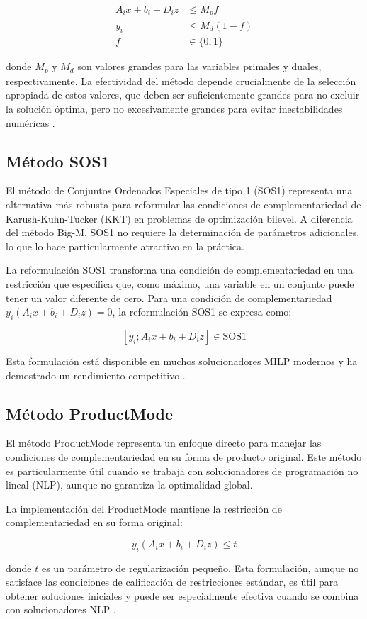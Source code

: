 \begin{align*}
A_ix + b_i + D_iz &\leq M_p f \\
y_i &\leq M_d(1 - f) \\
f &\in \{0,1\}
\end{align*}

donde $M_p$ y $M_d$ son valores grandes para las variables primales y duales, respectivamente. La efectividad del método depende crucialmente de la selección apropiada de estos valores, que deben ser suficientemente grandes para no excluir la solución óptima, pero no excesivamente grandes para evitar inestabilidades numéricas \cite{BilevelJump}.

\subsection{Método SOS1}

El método de Conjuntos Ordenados Especiales de tipo 1 (SOS1) representa una alternativa más robusta para reformular las condiciones de complementariedad de Karush-Kuhn-Tucker (KKT) en problemas de optimización bilevel. A diferencia del método Big-M, SOS1 no requiere la determinación de parámetros adicionales, lo que lo hace particularmente atractivo en la práctica.

La reformulación SOS1 transforma una condición de complementariedad en una restricción que especifica que, como máximo, una variable en un conjunto puede tener un valor diferente de cero. Para una condición de complementariedad $y_i(A_ix + b_i + D_iz) = 0$, la reformulación SOS1 se expresa como:

\[ [y_i ; A_ix + b_i + D_iz] \in \text{SOS1} \]

Esta formulación está disponible en muchos solucionadores MILP modernos y ha demostrado un rendimiento competitivo \cite{BilevelJump}.

\subsection{Método ProductMode}

El método ProductMode representa un enfoque directo para manejar las condiciones de complementariedad en su forma de producto original. Este método es particularmente útil cuando se trabaja con solucionadores de programación no lineal (NLP), aunque no garantiza la optimalidad global.

La implementación del ProductMode mantiene la restricción de complementariedad en su forma original:

\[ y_i(A_ix + b_i + D_iz) \leq t \]

donde $t$ es un parámetro de regularización pequeño. Esta formulación, aunque no satisface las condiciones de calificación de restricciones estándar, es útil para obtener soluciones iniciales y puede ser especialmente efectiva cuando se combina con solucionadores NLP \cite{BilevelJump}.